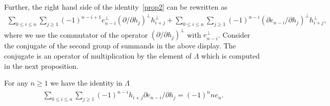 Further, the right hand side of the identity~\eqref{prop2} can be rewritten as
\begin{gather*}
\sum_{0\le i\le n}\sum_{j\ge1}(-1)^{n-i+1}e_{n-i}^{\perp}(\partial /\partial h_j)^{\perp}
h_{i+j}^{\perp}+\sum_{0\le i\le n}\sum_{j\ge1}(-1)^{n-i}(\partial e_{n-i}/\partial h_j)^{\perp}h_{i+j}^{\perp},
\end{gather*}
where we use the commutator of the operator $(\partial /\partial
h_j)^{\perp}$ with $e_{ n-i}^{\perp}$.
Consider the conjugate of the second group of summands in the above display.
The conjugate is an operator of multiplication by the element of $\Lambda$ which is computed in the next
proposition.
\begin{proposition}\label{Prop3}
For any $n\ge1$ we have the identity in $\Lambda$
\begin{gather}
\label{prop3}
\sum_{0\le i\le n}\sum_{j\ge1}(-1)^{n-i}h_{i+j}
\partial e_{n-i}/\partial
h_j=(-1)^nne_n.
\end{gather}
\end{proposition}
